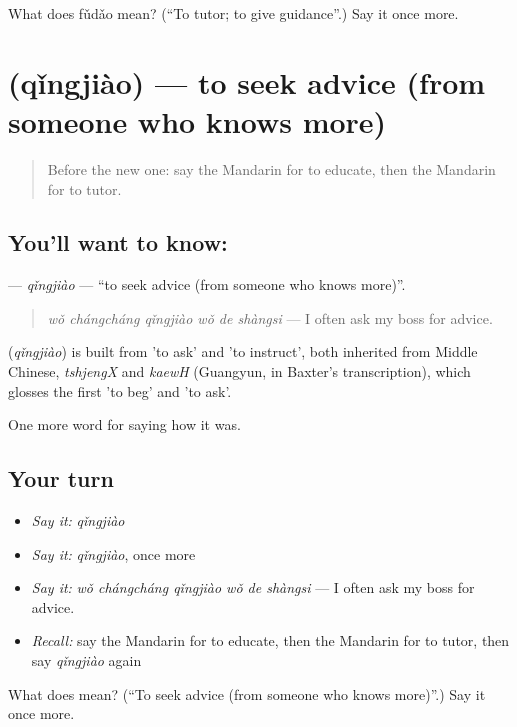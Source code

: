 \begin{tcolorbox}[breakable,colback=teal!4,colframe=teal!35!black,title={Before you move on}]
What does fǔdǎo mean? (\textquotedblleft{}To tutor; to give guidance\textquotedblright{}.) Say it once more.
\end{tcolorbox}
\section[\texorpdfstring{\zh{请教} (qǐngjiào)}{请教 (qǐngjiào)}]{ (qǐngjiào) — to seek advice (from someone who knows more)}

\label{lesson:ZH-C493-qingjiao}



\begin{quote}
Before the new one: say the Mandarin for to educate, then the Mandarin for to tutor.
\end{quote}

\subsection*{You'll want to know: }
\textbf{} — \emph{qǐngjiào} — \textquotedblleft{}to seek advice (from someone who knows more)\textquotedblright{}.

\begin{quote}
\textbf{} \emph{wǒ chángcháng qǐngjiào wǒ de shàngsi} — I often ask my boss for advice.
\end{quote}

\begin{cousinweb}
\textbf{} (\emph{qǐngjiào}) is built from  'to ask' and  'to instruct', both inherited from Middle Chinese, \emph{tshjengX} and \emph{kaewH} (Guangyun, in Baxter's transcription), which glosses the first 'to beg' and 'to ask'.
\end{cousinweb}

\begin{grammarlens}[title={What you've built}]
One more word for saying how it was.
\end{grammarlens}

\subsection*{Your turn}
\begin{itemize}
\raggedright
  \item \emph{Say it:} \emph{qǐngjiào}
  \item \emph{Say it:} \emph{qǐngjiào}, once more
  \item \emph{Say it:} \emph{wǒ chángcháng qǐngjiào wǒ de shàngsi} — I often ask my boss for advice.
  \item \emph{Recall:} say the Mandarin for to educate, then the Mandarin for to tutor, then say \emph{qǐngjiào} again
\end{itemize}

\begin{tcolorbox}[breakable,colback=teal!4,colframe=teal!35!black,title={Before you move on}]
What does  mean? (\textquotedblleft{}To seek advice (from someone who knows more)\textquotedblright{}.) Say it once more.
\end{tcolorbox}
